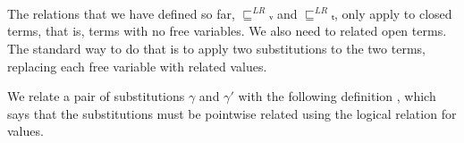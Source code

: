 \begin{code}
\AgdaOperator{\AgdaInductiveConstructor{,}}\AgdaSpace{}%
\AgdaSpace{}%
\AgdaOperator{\AgdaInductiveConstructor{,}}\AgdaSpace{}%
\AgdaSymbol{))}\<%
\\
%
\\[\AgdaEmptyExtraSkip]%
\>[0]\AgdaSpace{}%
\AgdaSymbol{:}\AgdaSpace{}%
\AgdaSpace{}%
\AgdaSpace{}%
\AgdaSpace{}%
\AgdaSpace{}%
\AgdaSpace{}%
\AgdaSymbol{\}}\AgdaSpace{}%
\AgdaSpace{}%
\AgdaSpace{}%
\AgdaSpace{}%
\AgdaSpace{}%
\AgdaSpace{}%
\<%
\\
\>[0]\AgdaSpace{}%
\AgdaSpace{}%
\AgdaSpace{}%
\AgdaSpace{}%
\AgdaSpace{}%
\AgdaSymbol{=}\AgdaSpace{}%
\AgdaSymbol{(}\AgdaSpace{}%
\AgdaSpace{}%
\AgdaSpace{}%
\AgdaSpace{}%
\AgdaSpace{}%
\AgdaSpace{}%
\AgdaSymbol{)}\AgdaSpace{}%
\AgdaSpace{}%
\AgdaSymbol{(}\AgdaSpace{}%
\AgdaSpace{}%
\AgdaSpace{}%
\AgdaSpace{}%
\AgdaSpace{}%
\AgdaSpace{}%
\AgdaSymbol{)}\<%
\end{code}

The relations that we have defined so far, $⊑^{LR}ᵥ$ and $⊑^{LR}ₜ$, only
apply to closed terms, that is, terms with no free variables.  We also
need to related open terms. The standard way to do that is to apply
two substitutions to the two terms, replacing each free variable with
related values.

We relate a pair of substitutions $γ$ and $γ′$ with the following
definition , which says that the substitutions must be pointwise
related using the logical relation for values.

